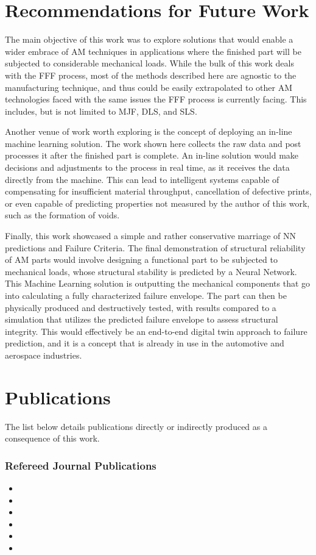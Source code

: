 \documentclass[main.tex]{subfiles}
\begin{document}
\section{Recommendations for Future Work}
The main objective of this work was to explore solutions that would enable a wider embrace of AM techniques in applications where the finished part will be subjected to considerable mechanical loads. While the bulk of this work deals with the FFF process, most of the methods described here are agnostic to the manufacturing technique, and thus could be easily extrapolated to other AM technologies faced with the same issues the FFF process is currently facing. This includes, but is not limited to MJF, DLS, and SLS. 

Another venue of work worth exploring is the concept of deploying an in-line machine learning solution. The work shown here collects the raw data and post processes it after the finished part is complete. An in-line solution would make decisions and adjustments to the process in real time, as it receives the data directly from the machine. This can lead to intelligent systems capable of compensating for insufficient material throughput, cancellation of defective prints, or even capable of predicting properties not measured by the author of this work, such as the formation of voids. 

Finally, this work showcased a simple and rather conservative marriage of NN predictions and Failure Criteria. The final demonstration of structural reliability of AM parts would involve designing a functional part to be subjected to mechanical loads, whose structural stability is predicted by a Neural Network. This Machine Learning solution is outputting the mechanical components that go into calculating a fully characterized failure envelope. The part can then be physically produced and destructively tested, with results compared to a simulation that utilizes the predicted failure envelope to assess structural integrity. This would effectively be an end-to-end digital twin approach to failure prediction, and it is a concept that is already in use in the automotive and aerospace industries.  

\section{Publications}

The list below details publications directly or indirectly produced as a consequence of this work.
\subsubsection{Refereed Journal Publications}
\begin{itemize}
	\item {}
	\item {}
	\item {}
	\item {}
	\item {}
	\item {}
\end{itemize}
\end{document}
